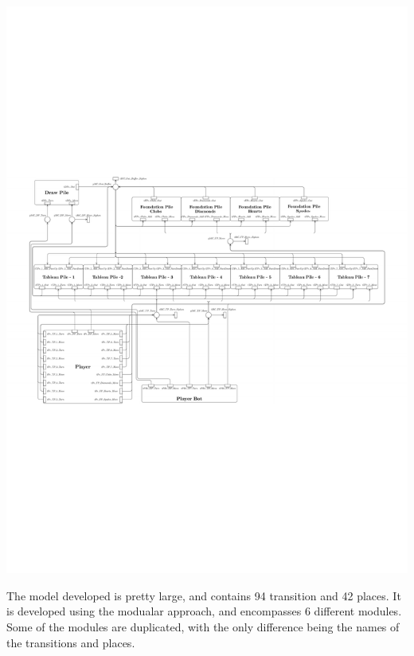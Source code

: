\documentclass[runningheads,a4paper]{llncs}
\begin{document}
\begin{center} %
	\includegraphics[trim=70 50 100 300,angle=90,scale=1.3]{images/overallViewPdf}
\end{center}
The model developed is pretty large, and contains 94 transition and 42 places. It is developed using the modualar approach, and encompasses 6 different modules. Some of the modules are duplicated, with the only difference being the names of the transitions and places.
\end{document}
